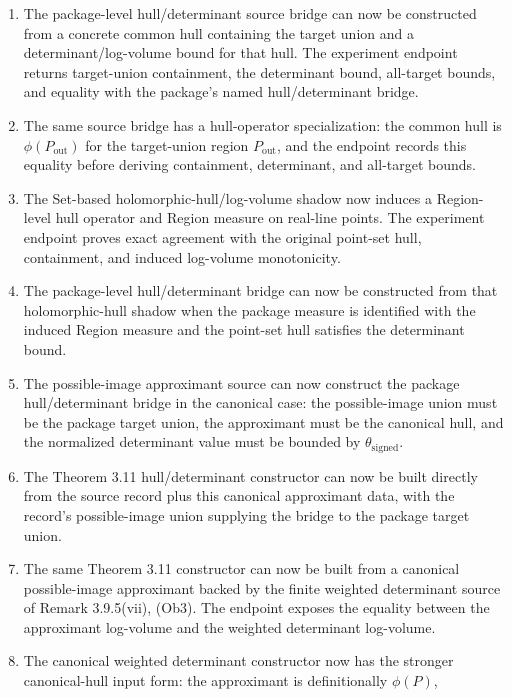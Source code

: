 \documentclass[11pt]{article}
\newcommand{\Lean}{Lean}
\theoremstyle{plain}
\theoremstyle{definition}
\theoremstyle{remark}
\begin{document}
\begin{enumerate}
  canonical holomorphic-hull approximant directly: \Lean{} identifies its
  set-theoretic union with the package target union before the determinant
  comparison is applied.
\item The package-level hull/determinant source bridge can now be constructed
  from a concrete common hull containing the target union and a
  determinant/log-volume bound for that hull.  The experiment endpoint returns
  target-union containment, the determinant bound, all-target bounds, and
  equality with the package's named hull/determinant bridge.
\item The same source bridge has a hull-operator specialization: the common
  hull is \(\phi(P_{\mathrm{out}})\) for the target-union region
  \(P_{\mathrm{out}}\), and the endpoint records this equality before deriving
  containment, determinant, and all-target bounds.
\item The Set-based holomorphic-hull/log-volume shadow now induces a
  Region-level hull operator and Region measure on real-line points.  The
  experiment endpoint proves exact agreement with the original point-set hull,
  containment, and induced log-volume monotonicity.
\item The package-level hull/determinant bridge can now be constructed from
  that holomorphic-hull shadow when the package measure is identified with the
  induced Region measure and the point-set hull satisfies the determinant
  bound.
\item The possible-image approximant source can now construct the package
  hull/determinant bridge in the canonical case: the possible-image union must
  be the package target union, the approximant must be the canonical hull, and
  the normalized determinant value must be bounded by \(\theta_{\mathrm{signed}}\).
\item The Theorem 3.11 hull/determinant constructor can now be built directly
  from the source record plus this canonical approximant data, with the record's
  possible-image union supplying the bridge to the package target union.
\item The same Theorem 3.11 constructor can now be built from a canonical
  possible-image approximant backed by the finite weighted determinant source
  of Remark 3.9.5(vii), (Ob3).  The endpoint exposes the equality between the
  approximant log-volume and the weighted determinant log-volume.
\item The canonical weighted determinant constructor now has the stronger
  canonical-hull input form: the approximant is definitionally \(\phi(P)\),

\end{enumerate}
\end{document}
